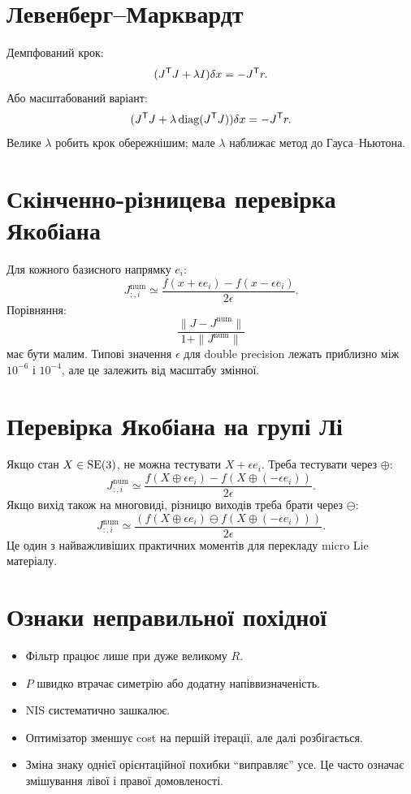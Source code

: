 \section{Левенберг--Марквардт}

Демпфований крок:
\[
(J^{\mathsf{T}} J+\lambda I)\delta x=-J^{\mathsf{T}} r.
\]
Або масштабований варіант:
\[
(J^{\mathsf{T}} J+\lambda\operatorname{diag}(J^{\mathsf{T}} J))\delta x=-J^{\mathsf{T}} r.
\]
Велике $\lambda$ робить крок обережнішим; мале $\lambda$ наближає метод до Гауса--Ньютона.

\section{Скінченно-різницева перевірка Якобіана}

Для кожного базисного напрямку $e_i$:
\[
J_{:,i}^{\mathrm{num}}
\simeq
\frac{f(x+\epsilon e_i)-f(x-\epsilon e_i)}{2\epsilon}.
\]
Порівняння:
\[
\frac{\|J-J^{\mathrm{num}}\|}{1+\|J^{\mathrm{num}}\|}
\]
має бути малим. Типові значення $\epsilon$ для double precision лежать приблизно між $10^{-6}$ і $10^{-4}$, але це залежить від масштабу змінної.

\section{Перевірка Якобіана на групі Лі}

Якщо стан $X\in\mathrm{SE}(3)$, не можна тестувати $X+\epsilon e_i$. Треба тестувати через $\oplus$:
\[
J_{:,i}^{\mathrm{num}}
\simeq
\frac{f(X\oplus\epsilon e_i)-f(X\oplus(-\epsilon e_i))}{2\epsilon}.
\]
Якщо вихід також на многовиді, різницю виходів треба брати через $\ominus$:
\[
J_{:,i}^{\mathrm{num}}
\simeq
\frac{(f(X\oplus\epsilon e_i)\ominus f(X\oplus(-\epsilon e_i)))}{2\epsilon}.
\]
Це один з найважливіших практичних моментів для перекладу micro Lie матеріалу.

\section{Ознаки неправильної похідної}

\begin{itemize}
\item Фільтр працює лише при дуже великому $R$.
\item $P$ швидко втрачає симетрію або додатну напіввизначеність.
\item NIS систематично зашкалює.
\item Оптимізатор зменшує cost на першій ітерації, але далі розбігається.
\item Зміна знаку однієї орієнтаційної похибки ``виправляє'' усе. Це часто означає змішування лівої і правої домовленості.
\end{itemize}
